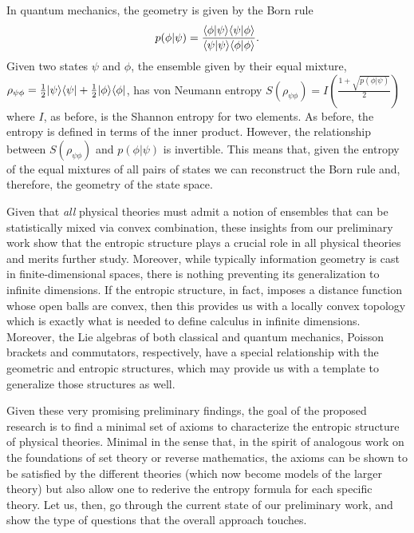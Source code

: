 In quantum mechanics, the geometry is given by the Born rule
\begin{equation}
	p(\phi|\psi) = \frac{\langle \phi | \psi \rangle\langle \psi | \phi \rangle}{\langle \psi | \psi \rangle\langle \phi | \phi \rangle}.
\end{equation}
Given two states $\psi$ and $\phi$, the ensemble given by their equal mixture, $\rho_{\psi\phi} = \frac{1}{2}|\psi\rangle\langle\psi|+\frac{1}{2}|\phi\rangle\langle\phi|$,  has von Neumann entropy $S(\rho_{\psi\phi}) = I\left(\frac{1 + \sqrt{p(\phi|\psi)}}{2} \right)$ where $I$, as before, is the Shannon entropy for two elements. As before, the entropy is defined in terms of the inner product. However, the relationship between $S(\rho_{\psi\phi})$ and $p(\phi|\psi)$ is invertible. This means that, given the entropy of the equal mixtures of all pairs of states we can reconstruct the Born rule and, therefore, the geometry of the state space.

Given that \emph{all} physical theories must admit a notion of ensembles that can be statistically mixed via convex combination, these insights from our preliminary work show that the entropic structure plays a crucial role in all physical theories and merits further study. Moreover, while typically information geometry is cast in finite-dimensional spaces, there is nothing preventing its generalization to infinite dimensions. If the entropic structure, in fact, imposes a distance function whose open balls are convex, then this provides us with a locally convex topology which is exactly what is needed to define calculus in infinite dimensions. Moreover, the Lie algebras of both classical and quantum mechanics, Poisson brackets and commutators, respectively, have a special relationship with the geometric and entropic structures, which may provide us with a template to generalize those structures as well. 

Given these very promising preliminary findings, the goal of the proposed research is to find a minimal set of axioms to characterize the entropic structure of physical theories. Minimal in the sense that, in the spirit of analogous work on the foundations of set theory or reverse mathematics, the axioms can be shown to be satisfied by the different theories (which now become models of the larger theory) but also allow one to rederive the entropy formula for each specific theory. Let us, then, go through the current state of our preliminary work, and show the type of questions that the overall approach touches.



